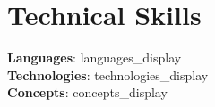 \vspace{-8pt}
\section{Technical Skills}
    \begin{itemize}[leftmargin=0.15in, label={}]
	\small{\item{
		\textbf{Languages}{: {{languages_display}}} \\
		\textbf{Technologies}{: {{technologies_display}}} \\
		\textbf{Concepts}{: {{concepts_display}} }
	}}
    \end{itemize}